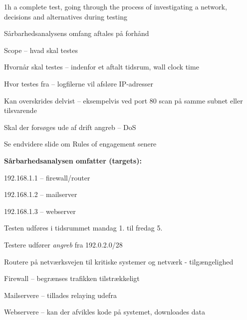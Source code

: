 \documentclass[Screen16to9,17pt]{foils}
\begin{document}
\begin{list1}
\item 1h a complete test, going through the process of investigating a network, decisions and alternatives during testing
\end{list1}




\begin{list1}
\item Sårbarhedsanalysens omfang aftales på forhånd
\begin{list2}
\item Scope -- hvad skal testes
\item Hvornår skal testes -- indenfor et aftalt tidsrum, wall clock time
\item Hvor testes fra -- logfilerne vil afsløre IP-adresser
\item Kan overskrides delvist -- eksempelvis ved port 80 scan på samme
  subnet eller tilsvarende
\item Skal der forsøges ude af drift angreb -- DoS
\item Se endvidere slide om Rules of engagement senere
\end{list2}
\item {\bf Sårbarhedsanalysen omfatter (targets):}
\begin{list2}
\item 192.168.1.1 -- firewall/router
\item 192.168.1.2 -- mailserver
\item 192.168.1.3 -- webserver
\item Testen udføres i tidsrummet mandag 1. til fredag 5.
\item Testere udfører \emph{angreb} fra 192.0.2.0/28
\end{list2}
\end{list1}




\begin{list2}
\item Routere på netværksvejen til kritiske systemer og netværk -
  tilgængelighed
\item Firewall -- begrænses trafikken tilstrækkeligt
\item Mailservere -- tillades relaying udefra
\item Webservere -- kan der afvikles kode på systemet, downloades data
\end{list2}
\end{document}
